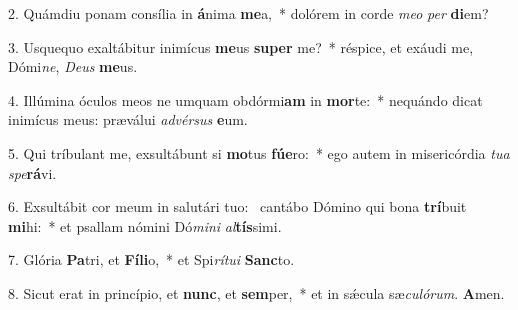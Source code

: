 2. Quámdiu ponam consília in \textbf{á}nima \textbf{me}a,~*  dolórem in corde \textit{me}\textit{o} \textit{per} \textbf{di}em?\

3. Usquequo exaltábitur inimícus \textbf{me}us \textbf{su}\textbf{per} me?~*  réspice, et exáudi me, Dómi\textit{ne}, \textit{De}\textit{us} \textbf{me}us.\

4. Illúmina óculos meos ne umquam obdórmi\textbf{am} in \textbf{mor}te:~*  nequándo dicat inimícus meus: præválui \textit{ad}\textit{vér}\textit{sus} \textbf{e}um.\

5. Qui tríbulant me, exsultábunt si \textbf{mo}tus \textbf{fú}\textbf{e}ro:~*  ego autem in misericórdia \textit{tu}\textit{a} \textit{spe}\textbf{rá}vi.\

6. Exsultábit cor meum in salutári tuo: \dag\  cantábo Dómino qui bona \textbf{trí}buit \textbf{mi}hi:~*  et psallam nómini Dó\textit{mi}\textit{ni} \textit{al}\textbf{tís}simi.\

7. Glória \textbf{Pa}tri, et \textbf{Fí}\textbf{li}o,~*  et Spi\textit{rí}\textit{tu}\textit{i} \textbf{Sanc}to.\

8. Sicut erat in princípio, et \textbf{nunc}, et \textbf{sem}per,~*  et in sǽcula sæ\textit{cu}\textit{ló}\textit{rum}. \textbf{A}men.\

